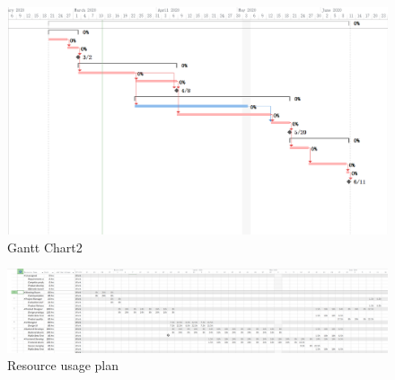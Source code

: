 \documentclass[runningheads]{llncs}
\begin{document}
\begin{figure}[H]
    \centering
    \includegraphics[width=1.0\textwidth]{./image/figure11}
    \caption{Gantt Chart2}
    \label{}
\end{figure}
\begin{figure}[H]
    \centering
    \includegraphics[width=1.0\textwidth]{./image/figure13}
    \caption{Resource usage plan}
    \label{}
\end{figure}
\end{document}
